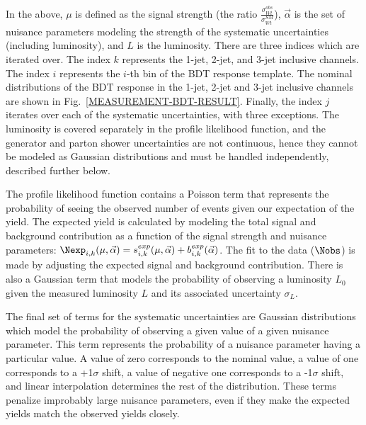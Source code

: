 \noindent
In the above, $\mu$ is defined as the signal strength (the ratio $\frac{\sigma^{obs}_{Wt}}{\sigma^{SM}_{Wt}}$), $\vec{\alpha}$ is the set of nuisance parameters modeling the strength of the systematic uncertainties (including luminosity), and $L$ is the luminosity. There are three indices which are iterated over. The index $k$ represents the 1-jet, 2-jet, and 3-jet inclusive channels. The index $i$ represents the $i$-th bin of the BDT response template. The nominal distributions of the BDT response in the 1-jet, 2-jet and 3-jet inclusive channels are shown in Fig.~\ref{MEASUREMENT-BDT-RESULT}. Finally, the index $j$ iterates over each of the systematic uncertainties, with three exceptions. The luminosity is covered separately in the profile likelihood function, and the generator and parton shower uncertainties are not continuous, hence they cannot be modeled as Gaussian distributions and must be handled independently, described further below.


The profile likelihood function contains a Poisson term that represents the probability of seeing the observed number of events given our expectation of the yield. The expected yield is calculated by modeling the total signal and background contribution as a function of the signal strength and nuisance parameters: $\Nexp_{i,k}(\mu,\vec{\alpha}) = s^{exp}_{i,k}(\mu,\vec{\alpha})+b^{exp}_{i,k}(\vec{\alpha})$. The fit to the data ($\Nobs$) is made by adjusting the expected signal and background contribution. There is also a Gaussian term that models the probability of observing a luminosity $L_0$ given the measured luminosity $L$ and its associated uncertainty $\sigma_L$. 

The final set of terms for the systematic uncertainties are Gaussian distributions which model the probability of observing a given value of a given nuisance parameter. This term represents the probability of a nuisance parameter having a particular value. A value of zero corresponds to the nominal value, a value of one corresponds to a +1$\sigma$ shift, a value of negative one corresponds to a -1$\sigma$ shift, and linear interpolation determines the rest of the distribution.  These terms penalize improbably large nuisance parameters, even if they make the expected yields match the observed yields closely. 

